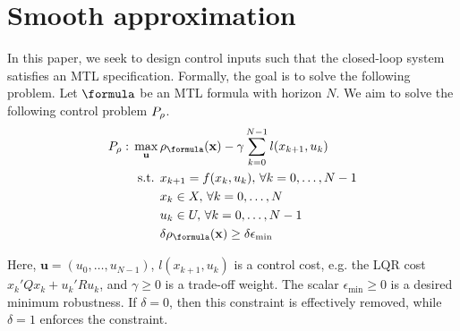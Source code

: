\section{Smooth approximation}
\label{sec:smooth apx}
\newcommand{\fe}{f_\varepsilon}

In this paper, we seek to design control inputs such that the closed-loop system satisfies an MTL specification.
Formally, the goal is to solve the following problem.
Let $\formula$ be an MTL formula with horizon $N$.
We aim to solve the following control problem $P_\rho$.
\begin{subequations}
	\label{eq:general_ctrl}
	\begin{align}
	P_\rob:\, \max_{\mathbf{u}}\, & \rob_{\formula}(\sstraj) - \gamma \sum_{k=0}^{N-1} l(x_{k+1},u_{k}) \label{eq:general ctrl obj}\\
	\text{s.t. } & x_{k+1} = f(x_k,u_k), \, \forall k=0,\dotsc,N-1 \label{eq:general ctrl dyn}\\
	& x_k \in X, \, \forall k=0,\dotsc,N \label{eq:general ctrl X}\\
	& u_k \in U, \, \forall k=0,\dotsc,N-1 \label{eq:general ctrl U}\\
	& \delta \rob_{\formula}(\sstraj) \geq \delta \epsilon_{\text{min}} \label{eq:general ctrl pos rob}
	\end{align}
\end{subequations}

Here, $\mathbf{u} = (u_0,\ldots,u_{N-1})$, 
$l(x_{k+1},u_{k})$ is a control cost, e.g. the LQR cost $x_k'Qx_k + u_k'Ru_k$,
and $\gamma \geq 0$ is a trade-off weight. 
The scalar $\epsilon_{\text{min}} \geq 0$ is a desired minimum robustness. 
If $\delta = 0$, then this constraint is effectively removed, while $\delta=1$ enforces the constraint.






